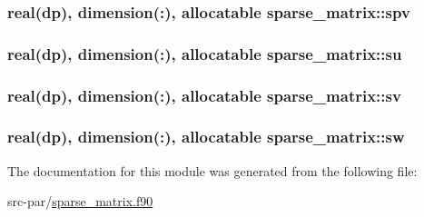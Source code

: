 \hypertarget{classsparse__matrix_a18a8d88bb263103e7f90204933644fd5}{
\subsubsection[{spv}]{\setlength{\rightskip}{0pt plus 5cm}real(dp), dimension(\-:), allocatable sparse\-\_\-matrix\-::spv}}\label{classsparse__matrix_a18a8d88bb263103e7f90204933644fd5}
\hypertarget{classsparse__matrix_ade8eb3ba921407598d6d1a07ebacc9cd}{
\subsubsection[{su}]{\setlength{\rightskip}{0pt plus 5cm}real(dp), dimension(\-:), allocatable sparse\-\_\-matrix\-::su}}\label{classsparse__matrix_ade8eb3ba921407598d6d1a07ebacc9cd}
\hypertarget{classsparse__matrix_accb06b29e89794ede55aebd48d3d91b2}{
\subsubsection[{sv}]{\setlength{\rightskip}{0pt plus 5cm}real(dp), dimension(\-:), allocatable sparse\-\_\-matrix\-::sv}}\label{classsparse__matrix_accb06b29e89794ede55aebd48d3d91b2}
\hypertarget{classsparse__matrix_a4a73c86b95b3ef82f3f1c2b9fb0aab03}{
\subsubsection[{sw}]{\setlength{\rightskip}{0pt plus 5cm}real(dp), dimension(\-:), allocatable sparse\-\_\-matrix\-::sw}}\label{classsparse__matrix_a4a73c86b95b3ef82f3f1c2b9fb0aab03}


The documentation for this module was generated from the following file\-:\begin{DoxyCompactItemize}
\item 
src-\/par/\hyperlink{sparse__matrix_8f90}{sparse\-\_\-matrix.\-f90}\end{DoxyCompactItemize}
